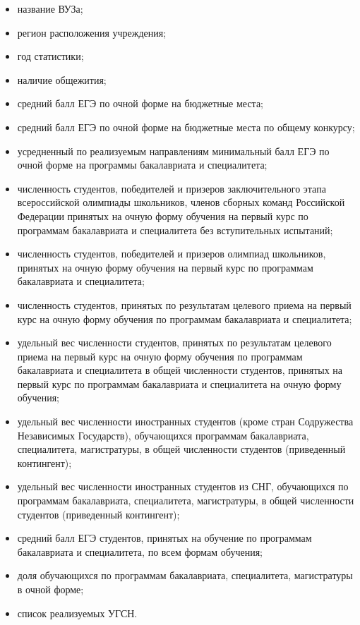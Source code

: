 \begin{itemize}[leftmargin=1.6\parindent]
	\item название ВУЗа;
	\item регион расположения учреждения;
	\item год статистики;
	\item наличие общежития;
	\item средний балл ЕГЭ по очной форме на бюджетные места;
	\item средний балл ЕГЭ по очной форме на бюджетные места по общему конкурсу;
	\item усредненный по реализуемым направлениям минимальный балл ЕГЭ по очной форме на программы бакалавриата и специалитета;
	\item численность студентов, победителей и призеров заключительного этапа всероссийской олимпиады школьников, членов сборных команд Российской Федерации принятых на очную форму обучения на первый курс по программам бакалавриата и специалитета без вступительных испытаний;
	\item численность студентов, победителей и призеров олимпиад школьников, принятых на очную форму обучения на первый курс по программам бакалавриата и специалитета;
	\item численность студентов, принятых по результатам целевого приема на первый курс на очную форму обучения по программам бакалавриата и специалитета;
	\item удельный вес численности студентов, принятых по результатам целевого приема на первый курс на очную форму обучения по программам бакалавриата и специалитета в общей численности студентов, принятых на первый курс по программам бакалавриата и специалитета на очную форму обучения;
	\item удельный вес численности иностранных студентов (кроме стран Содружества Независимых Государств), обучающихся программам бакалавриата, специалитета, магистратуры, в общей численности студентов (приведенный контингент);
	\item удельный вес численности иностранных студентов из СНГ, обучающихся по программам бакалавриата, специалитета, магистратуры, в общей численности студентов (приведенный контингент);
	\item средний балл ЕГЭ студентов, принятых на обучение по программам бакалавриата и специалитета, по всем формам обучения;
	\item доля обучающихся по программам бакалавриата, специалитета, магистратуры в очной форме;
	\item список реализуемых УГСН.
\end{itemize}

